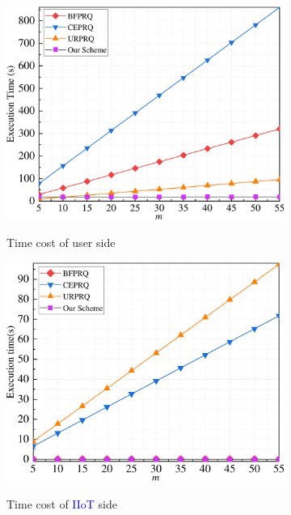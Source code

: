 \documentclass[IEEE JOURNAL OF BIOMEDICAL AND HEALTH INFORMATICS]{IEEEtran}
\begin{document}
{\begin{figure}%
	\centering
	\begin{subfigure}[t]{0.3\textwidth}
		\centering
		\includegraphics[width=1\textwidth]{com_1m}\\
		\caption{Time cost of user side}\label{com_1m}	
	\end{subfigure}
	\quad
	\begin{subfigure}[t]{0.3\textwidth}
		\centering
		\includegraphics[width=1\textwidth]{com_2m}\\
		\caption{Time cost of \textcolor{blue}{IIoT} side}\label{com_2m}
	\end{subfigure}
	\quad
	\begin{subfigure}[t]{0.3\textwidth}

\end{subfigure}
\end{figure}}
\end{document}
